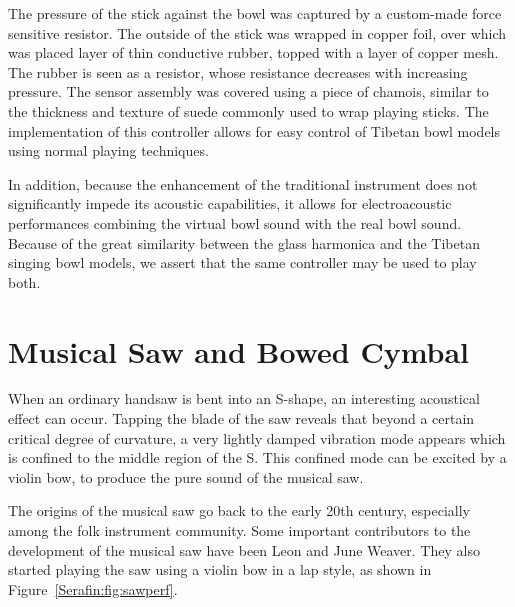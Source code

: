 The pressure of the stick against the bowl was captured by a custom-made force sensitive resistor. The outside of the stick was wrapped in copper foil, over which was placed layer of thin conductive rubber, topped with a layer of copper mesh. The rubber is seen as a resistor, whose resistance decreases with increasing pressure. The sensor assembly was covered using a piece of chamois, similar to the thickness and texture of suede commonly used to wrap playing sticks. The implementation of this controller allows for easy control of Tibetan bowl models using normal playing techniques.

In addition, because the enhancement of the traditional instrument does not significantly impede its acoustic capabilities, it allows for electroacoustic performances combining the virtual bowl sound with the real bowl sound. Because of the great similarity between the glass harmonica and the Tibetan singing bowl models, we assert that the same controller may be used to play both.

\section{Musical Saw and Bowed Cymbal}

When an ordinary handsaw is bent into an S-shape, an interesting acoustical effect can occur. Tapping the blade of the saw reveals that beyond a certain critical degree of curvature, a very lightly damped vibration mode appears which is confined to the middle region of the S. This confined mode can be excited by a violin bow, to produce the pure sound of the musical saw.

The origins of the musical saw go back to the early 20th century, especially among the folk instrument community. Some important contributors to the development of the musical saw have been Leon and June Weaver. They also started playing the saw using a violin bow in a lap style, as shown in Figure~\ref{Serafin:fig:sawperf}.

